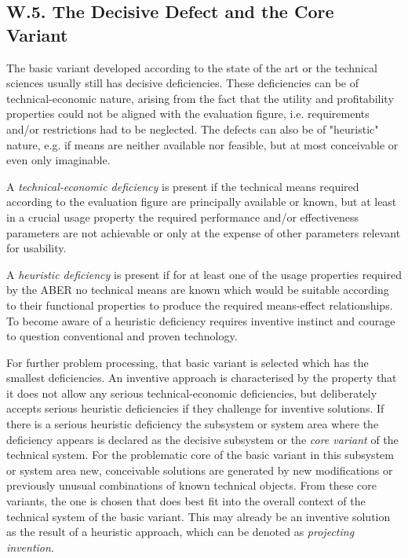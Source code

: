 \documentclass[11pt,a4paper]{article}
\begin{document}
\subsection*{W.5. The Decisive Defect and the Core Variant}

The basic variant developed according to the state of the art or the technical
sciences usually still has decisive deficiencies. These deficiencies can be of
technical-economic nature, arising from the fact that the utility and
profitability properties could not be aligned with the evaluation figure, i.e.
requirements and/or restrictions had to be neglected. The defects can also be
of "heuristic" nature, e.g. if means are neither available nor feasible, but
at most conceivable or even only imaginable.

A \emph{technical-economic deficiency} is present if the technical means
required according to the evaluation figure are principally available or known,
but at least in a crucial usage property the required performance and/or
effectiveness parameters are not achievable or only at the expense of other
parameters relevant for usability.

A \emph{heuristic deficiency} is present if for at least one of the usage
properties required by the ABER no technical means are known which would be
suitable according to their functional properties to produce the required
means-effect relationships. To become aware of a heuristic deficiency requires
inventive instinct and courage to question conventional and proven technology.

For further problem processing, that basic variant is selected which has the
smallest deficiencies. An inventive approach is characterised by the property
that it does not allow any serious technical-economic deficiencies, but
deliberately accepts serious heuristic deficiencies if they challenge for
inventive solutions.  If there is a serious heuristic deficiency the subsystem
or system area where the deficiency appears is declared as the decisive
subsystem or the \emph{core variant} of the technical system. For the
problematic core of the basic variant in this subsystem or system area new,
conceivable solutions are generated by new modifications or previously unusual
combinations of known technical objects.  From these core variants, the one is
chosen that does best fit into the overall context of the technical system of
the basic variant. This may already be an inventive solution as the result of
a heuristic approach, which can be denoted as \emph{projecting invention}.
\end{document}
